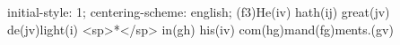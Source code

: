 initial-style: 1;
centering-scheme: english;
(f3)He(iv) hath(ij) great(jv) de(jv)light(i) <sp>*</sp> in(gh) his(iv) com(hg)mand(fg)ments.(gv)